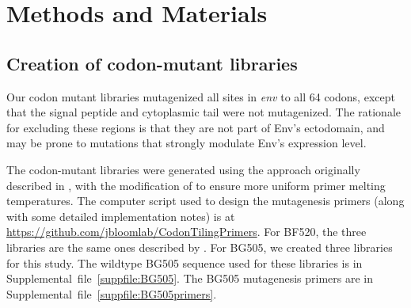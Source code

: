 \documentclass[9pt]{elife}
\begin{document}
\clearpage
\section{Methods and Materials}

\subsection{Creation of codon-mutant libraries}
Our codon mutant libraries mutagenized all sites in \textit{env} to all 64 codons, except that the signal peptide and cytoplasmic tail were not mutagenized.
The rationale for excluding these regions is that they are not part of Env's ectodomain, and may be prone to mutations that strongly modulate Env's expression level.

The codon-mutant libraries were generated using the approach originally described in \citet{bloom2014experimentally}, with the modification of \citet{dingens2017comprehensive} to ensure more uniform primer melting temperatures.
The computer script used to design the mutagenesis primers (along with some detailed implementation notes) is at \url{https://github.com/jbloomlab/CodonTilingPrimers}.
For BF520, the three libraries are the same ones described by \citet{dingens2017comprehensive}.
For BG505, we created three libraries for this study.
The wildtype BG505 sequence used for these libraries is in Supplemental~file~\ref{suppfile:BG505}.
The BG505 mutagenesis primers are in Supplemental~file~\ref{suppfile:BG505primers}.
\end{document}
